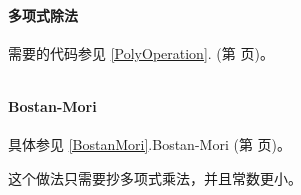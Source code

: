 \paragraph{多项式除法} 需要的代码参见 \ref{PolyOperation}. (第 \pageref{PolyOperation} 页)。

\inputminted{cpp}{../src/math/快速线性递推-多项式除法.cpp}

\paragraph{Bostan-Mori} 具体参见 \ref{BostanMori}.Bostan-Mori (第 \pageref{BostanMori} 页)。

这个做法只需要抄多项式乘法，并且常数更小。

\inputminted{cpp}{../src/math/快速线性递推-BostanMori.cpp}
